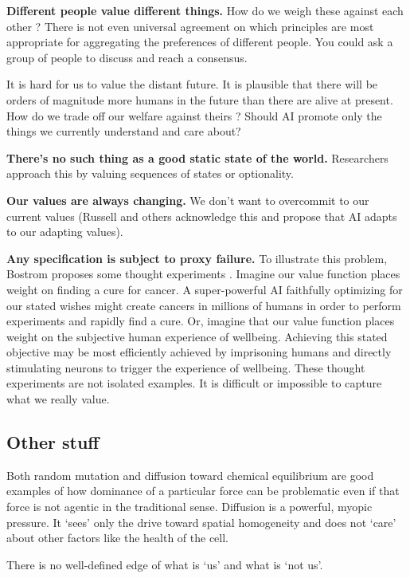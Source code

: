 \textbf{Different people value different things.} How do we weigh these against each other \citep{sorensen2024roadmap}? There is not even universal agreement on which principles are most appropriate for aggregating the preferences of different people. You could ask a group of people to discuss and reach a consensus. 

It is hard for us to value the distant future. It is plausible that there will be orders of magnitude more humans in the future than there are alive at present. How do we trade off our welfare against theirs \citep{macaskill2022what}? Should AI promote only the things we currently understand and care about?

\textbf{There's no such thing as a good static state of the world.} Researchers approach this by valuing sequences of states or optionality.

\textbf{Our values are always changing.} We don't want to overcommit to our current values (Russell and others acknowledge this and propose that AI adapts to our adapting values). 

\textbf{Any specification is subject to proxy failure.} To illustrate this problem, Bostrom proposes some thought experiments \citep{bostrom2014superintelligence}. Imagine our value function places weight on finding a cure for cancer. A super-powerful AI faithfully optimizing for our stated wishes might create cancers in millions of humans in order to perform experiments and rapidly find a cure. Or, imagine that our value function places weight on the subjective human experience of wellbeing. Achieving this stated objective may be most efficiently achieved by imprisoning humans and directly stimulating neurons to trigger the experience of wellbeing. These thought experiments are not isolated examples. It is difficult or impossible to capture what we really value.


\subsection{Other stuff}


Both random mutation and diffusion toward chemical equilibrium are good examples of how dominance of a particular force can be problematic even if that force is not agentic in the traditional sense. Diffusion is a powerful, myopic pressure. It `sees' only the drive toward spatial homogeneity and does not `care' about other factors like the health of the cell.

There is no well-defined edge of what is `us' and what is `not us'.

